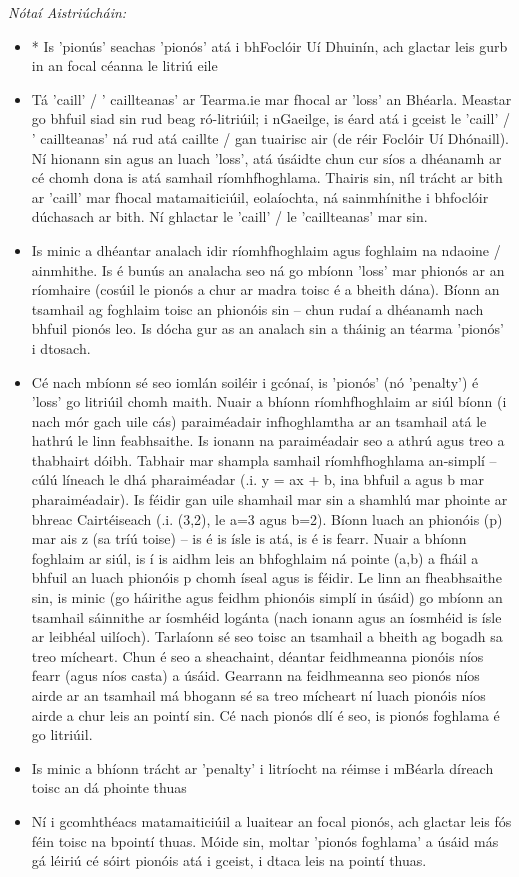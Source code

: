 \documentclass{article}
\begin{document}
 \noindent \textit{Nótaí Aistriúcháin:}
\begin{itemize}
	\item * Is 'pionús' seachas 'pionós' atá i bhFoclóir Uí Dhuinín, ach glactar leis gurb in an focal céanna le litriú eile
	\item Tá 'caill' / ' caillteanas' ar Tearma.ie mar fhocal ar 'loss' an Bhéarla. Meastar go bhfuil siad sin rud beag ró-litriúil; i nGaeilge, is éard atá i gceist le 'caill' / ' caillteanas' ná rud atá caillte / gan tuairisc air (de réir Foclóir Uí Dhónaill). Ní hionann sin agus an luach 'loss', atá úsáidte chun cur síos a dhéanamh ar cé chomh dona is atá samhail ríomhfhoghlama. Thairis sin, níl trácht ar bith ar 'caill' mar fhocal matamaiticiúil, eolaíochta, ná sainmhínithe i bhfoclóir dúchasach ar bith. Ní ghlactar le 'caill' / le 'caillteanas' mar sin.
	\item Is minic a dhéantar analach idir ríomhfhoghlaim agus foghlaim na ndaoine / ainmhithe. Is é bunús an analacha seo ná go mbíonn 'loss' mar phionós ar an ríomhaire (cosúil le pionós a chur ar madra toisc é a bheith dána). Bíonn an tsamhail ag foghlaim toisc an phionóis sin -- chun rudaí a dhéanamh nach bhfuil pionós leo. Is dócha gur as an analach sin a tháinig an téarma 'pionós' i dtosach.
	\item Cé nach mbíonn sé seo iomlán soiléir i gcónaí, is 'pionós' (nó 'penalty') é 'loss' go litriúil chomh maith. Nuair a bhíonn ríomhfhoghlaim ar siúl bíonn (i nach mór gach uile cás) paraiméadair infhoghlamtha ar an tsamhail atá le hathrú le linn feabhsaithe. Is ionann na paraiméadair seo a athrú agus treo a thabhairt dóibh. Tabhair mar shampla samhail ríomhfhoghlama an-simplí -- cúlú líneach le dhá pharaiméadar (.i. y = ax + b, ina bhfuil a agus b mar pharaiméadair). Is féidir gan uile shamhail mar sin a shamhlú mar phointe ar bhreac Cairtéiseach (.i. (3,2), le a=3 agus b=2). Bíonn luach an phionóis (p) mar ais z (sa tríú toise) -- is é is ísle is atá, is é is fearr. Nuair a bhíonn foghlaim ar siúl, is í is aidhm leis an bhfoghlaim ná pointe (a,b) a fháil a bhfuil an luach phionóis p chomh íseal agus is féidir. Le linn an fheabhsaithe sin, is minic (go háirithe agus feidhm phionóis simplí in úsáid) go mbíonn an tsamhail sáinnithe ar íosmhéid logánta (nach ionann agus an íosmhéid is ísle ar leibhéal uilíoch). Tarlaíonn sé seo toisc an tsamhail a bheith ag bogadh sa treo mícheart. Chun é seo a sheachaint, déantar feidhmeanna pionóis níos fearr (agus níos casta) a úsáid. Gearrann na feidhmeanna seo pionós níos airde ar an tsamhail má bhogann sé sa treo mícheart ní luach pionóis níos airde a chur leis an pointí sin. Cé nach pionós dlí é seo, is pionós foghlama é go litriúil.
	\item Is minic a bhíonn trácht ar 'penalty' i litríocht na réimse i mBéarla díreach toisc an dá phointe thuas
	\item Ní i gcomhthéacs matamaiticiúil a luaitear an focal pionós, ach glactar leis fós féin toisc na bpointí thuas. Móide sin, moltar 'pionós foghlama' a úsáid más gá léiriú cé sóirt pionóis atá i gceist, i dtaca leis na pointí thuas.
\end{itemize}
\end{document}
